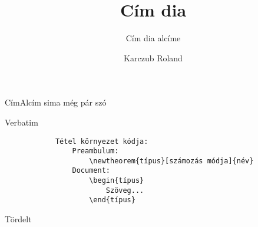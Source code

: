 \documentclass[aspectratio=169, bigger, xcolor=table]{beamer}
\begin{document}
    \begin{frame}
        \author{Karczub Roland}
        \title{Cím dia}
        \subtitle{Cím dia alcíme}
        
        \maketitle
    \end{frame}

    \begin{frame}{Cím}{Alcím}
        sima
        \newline
        még pár szó
    \end{frame}
    
    \begin{frame}[fragile]{Verbatim}
        \begin{verbatim}
            Tétel környezet kódja:
                Preambulum:
                    \newtheorem{típus}[számozás módja]{név}
                Document:
                    \begin{típus}
                        Szöveg...
                    \end{típus}
        \end{verbatim}
    \end{frame}
    
    \begin{frame}[allowframebreaks]{Tördelt}
        \lipsum[2-5]
    \end{frame}
    
\end{document}
